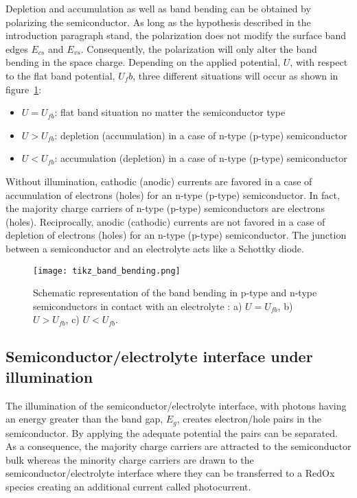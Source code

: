     Depletion and accumulation as well as band bending can be obtained 
    by polarizing the semiconductor. 
    As long as the hypothesis described in the introduction paragraph stand, 
    the polarization does not modify the surface band edges $E_{cs}$ and $E_{vs}$. 
    Consequently, the polarization will only alter the band bending in the space 
    charge. 
    Depending on the applied potential, $U$, with respect to the flat band 
    potential, $U_fb$, three different situations will occur as shown in 
    figure~\ref{fig_band_bending}:
    \begin{itemize}
    \item $U = U_{fb}$: flat band situation no matter the semiconductor type
    \item $U > U_{fb}$: depletion (accumulation) in a case of n-type (p-type) semiconductor  
    \item $U < U_{fb}$: accumulation (depletion) in a case of n-type (p-type) semiconductor
    \end{itemize}

    Without illumination, cathodic (anodic) currents are favored in a case of 
    accumulation of electrons (holes) for an n-type (p-type) semiconductor. 
    In fact, the majority charge carriers of n-type (p-type) semiconductors are 
    electrons (holes). 
    Reciprocally, anodic (cathodic) currents are not favored in a case of 
    depletion of electrons (holes) for an n-type (p-type) semiconductor. 
    The junction between a semiconductor and an electrolyte acts like a Schottky diode.

    \begin{figure}[H]
        \centering
            \texttt{[image: tikz\_band\_bending.png]}
        \caption{Schematic representation of the band bending in p-type and n-type 
        semiconductors in contact with an electrolyte \citep{memming2008, bard2002}:
         a) $U = U_{fb}$, b) $U > U_{fb}$, c) $U < U_{fb}$.}
        \label{fig_band_bending}
    \end{figure}
    \clearpage


\subsection{Semiconductor/electrolyte interface under illumination}
    The illumination of the semiconductor/electrolyte interface, 
    with photons having an energy greater than the band gap, $E_g$, creates 
    electron/hole pairs in the semiconductor. 
    By applying the adequate potential the pairs can be separated. 
    As a consequence, the majority charge carriers are attracted to the 
    semiconductor bulk whereas the minority charge carriers are drawn to the 
    semiconductor/electrolyte interface where they can be transferred to a RedOx 
    species creating an additional current called photocurrent.  

